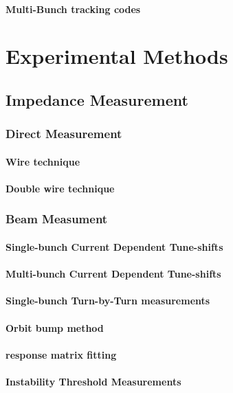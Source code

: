 \subsubsection{Multi-Bunch tracking codes}


\chapter{Experimental Methods}
\section{Impedance Measurement}
\subsection{Direct Measurement}
\subsubsection{Wire technique}
\subsubsection{Double wire technique}
\subsection{Beam Measument}
\subsubsection{Single-bunch Current Dependent Tune-shifts}
\subsubsection{Multi-bunch Current Dependent Tune-shifts}
\subsubsection{Single-bunch Turn-by-Turn measurements}
\subsubsection{Orbit bump method}
\subsubsection{response matrix fitting}
\subsubsection{Instability Threshold Measurements}
